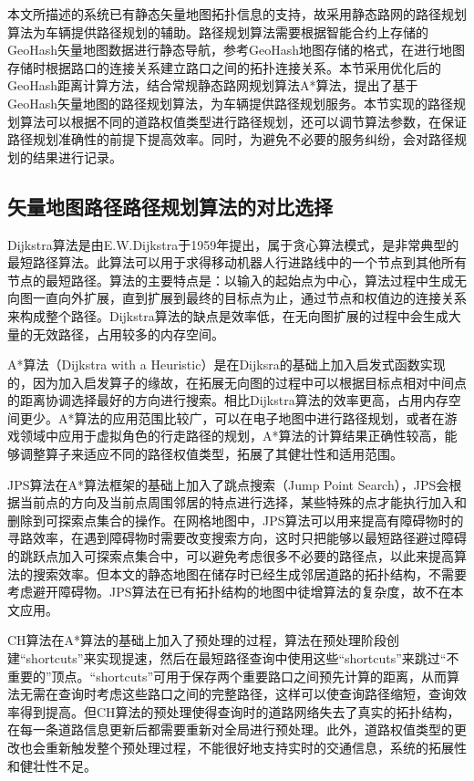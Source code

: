 本文所描述的系统已有静态矢量地图拓扑信息的支持，故采用静态路网的路径规划算法为车辆提供路径规划的辅助。路径规划算法需要根据智能合约上存储的GeoHash矢量地图数据进行静态导航，参考GeoHash地图存储的格式，在进行地图存储时根据路口的连接关系建立路口之间的拓扑连接关系。本节采用优化后的GeoHash距离计算方法，结合常规静态路网规划算法A*算法，提出了基于GeoHash矢量地图的路径规划算法，为车辆提供路径规划服务。本节实现的路径规划算法可以根据不同的道路权值类型进行路径规划，还可以调节算法参数，在保证路径规划准确性的前提下提高效率。同时，为避免不必要的服务纠纷，会对路径规划的结果进行记录。

\subsection{矢量地图路径路径规划算法的对比选择}

Dijkstra算法是由E.W.Dijkstra于1959年提出，属于贪心算法模式，是非常典型的最短路径算法。此算法可以用于求得移动机器人行进路线中的一个节点到其他所有节点的最短路径。算法的主要特点是：以输入的起始点为中心，算法过程中生成无向图一直向外扩展，直到扩展到最终的目标点为止，通过节点和权值边的连接关系来构成整个路径。Dijkstra算法的缺点是效率低，在无向图扩展的过程中会生成大量的无效路径，占用较多的内存空间。

A*算法（Dijkstra with a Heuristic）是在Dijksra的基础上加入启发式函数实现的，因为加入启发算子的缘故，在拓展无向图的过程中可以根据目标点相对中间点的距离协调选择最好的方向进行搜索。相比Dijkstra算法的效率更高，占用内存空间更少。A*算法的应用范围比较广，可以在电子地图中进行路径规划，或者在游戏领域中应用于虚拟角色的行走路径的规划，A*算法的计算结果正确性较高，能够调整算子来适应不同的路径权值类型，拓展了其健壮性和适用范围。

JPS算法在A*算法框架的基础上加入了跳点搜索（Jump Point Search），JPS会根据当前点的方向及当前点周围邻居的特点进行选择，某些特殊的点才能执行加入和删除到可探索点集合的操作。在网格地图中，JPS算法可以用来提高有障碍物时的寻路效率，在遇到障碍物时需要改变搜索方向，这时只把能够以最短路径避过障碍的跳跃点加入可探索点集合中，可以避免考虑很多不必要的路径点，以此来提高算法的搜索效率。但本文的静态地图在储存时已经生成邻居道路的拓扑结构，不需要考虑避开障碍物。JPS算法在已有拓扑结构的地图中徒增算法的复杂度，故不在本文应用。

CH算法在A*算法的基础上加入了预处理的过程，算法在预处理阶段创建“shortcuts”来实现提速，然后在最短路径查询中使用这些“shortcuts”来跳过“不重要的”顶点。“shortcuts”可用于保存两个重要路口之间预先计算的距离，从而算法无需在查询时考虑这些路口之间的完整路径，这样可以使查询路径缩短，查询效率得到提高。但CH算法的预处理使得查询时的道路网络失去了真实的拓扑结构，在每一条道路信息更新后都需要重新对全局进行预处理。此外，道路权值类型的更改也会重新触发整个预处理过程，不能很好地支持实时的交通信息，系统的拓展性和健壮性不足。

